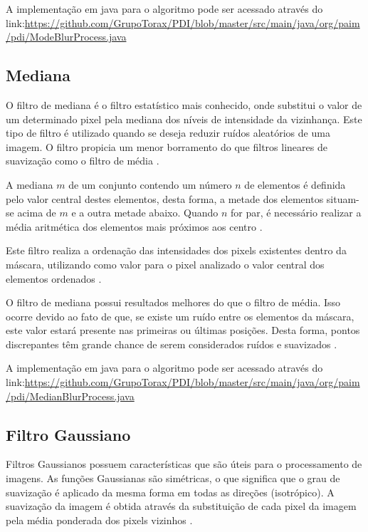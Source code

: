 \documentclass[
	12pt,				%
	oneside,			%
	a4paper,			%
	english,			%
	french,				%
	spanish,			%
	brazil,				%
	]{abntex2}
\begin{document}
A implementação em java para o algoritmo pode ser acessado através do link:\url{https://github.com/GrupoTorax/PDI/blob/master/src/main/java/org/paim/pdi/ModeBlurProcess.java}

\subsection{Mediana}

O filtro de mediana é o filtro estatístico mais conhecido, onde substitui o valor de um determinado pixel pela mediana dos níveis de intensidade da vizinhança. Este tipo de filtro é utilizado quando se deseja reduzir ruídos aleatórios de uma imagem. O filtro propicia um menor borramento do que filtros lineares de suavização como o filtro de média \cite{gonzalesWoods:2008}.

A mediana \(m\) de um conjunto contendo um número \(n\) de elementos é definida pelo valor central destes elementos, desta forma, a metade dos elementos situam-se acima de \(m\) e a outra metade abaixo. Quando \(n\) for par, é necessário realizar a média aritmética dos elementos mais próximos aos centro \cite{conciAzevedoLeta:2008}.

Este filtro realiza a ordenação das intensidades dos pixels existentes dentro da máscara, utilizando como valor para o pixel analizado o valor central dos elementos ordenados \cite{conciAzevedoLeta:2008}.

O filtro de mediana possui resultados melhores do que o filtro de média. Isso ocorre devido ao fato de que, se existe um ruído entre os elementos da máscara, este valor estará presente nas primeiras ou últimas posições. Desta forma, pontos discrepantes têm grande chance de serem considerados ruídos e suavizados \cite{conciAzevedoLeta:2008}.

A implementação em java para o algoritmo pode ser acessado através do link:\url{https://github.com/GrupoTorax/PDI/blob/master/src/main/java/org/paim/pdi/MedianBlurProcess.java} 

\subsection{Filtro Gaussiano}
Filtros Gaussianos possuem características que são úteis para o processamento de imagens. As funções Gaussianas são simétricas, o que significa que o grau de suavização é aplicado da mesma forma em todas as direções (isotrópico). A suavização da imagem é obtida através da substituição de cada pixel da imagem pela média ponderada dos pixels vizinhos \cite{pedriniSchwartz:2008}. 
\end{document}
